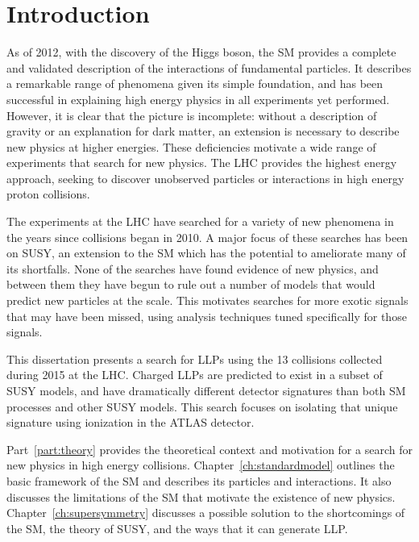 \chapter{Introduction}

\label{ch:introduction}

As of 2012, with the discovery of the Higgs boson, the \ac{SM} provides a complete and validated description of the interactions of fundamental particles.
It describes a remarkable range of phenomena given its simple foundation, and has been successful in explaining high energy physics in all experiments yet performed.
However, it is clear that the picture is incomplete: without a description of gravity or an explanation for dark matter, an extension is necessary to describe new physics at higher energies.
These deficiencies motivate a wide range of experiments that search for new physics.
The \ac{LHC} provides the highest energy approach, seeking to discover unobserved particles or interactions in high energy proton collisions.

The experiments at the \ac{LHC} have searched for a variety of new phenomena in the years since collisions began in 2010.
A major focus of these searches has been on \ac{SUSY}, an extension to the \ac{SM} which has the potential to ameliorate many of its shortfalls.
None of the searches have found evidence of new physics, and between them they have begun to rule out a number of models that would predict new particles at the \TeV scale.
This motivates searches for more exotic signals that may have been missed, using analysis techniques tuned specifically for those signals.

This dissertation presents a search for \acp{LLP} using the 13 \TeV collisions collected during 2015 at the \ac{LHC}.
Charged \acp{LLP} are predicted to exist in a subset of \ac{SUSY} models, and have dramatically different detector signatures than both \ac{SM} processes and other \ac{SUSY} models.
This search focuses on isolating that unique signature using ionization in the ATLAS detector. 

Part~\ref{part:theory} provides the theoretical context and motivation for a search for new physics in high energy collisions.
Chapter~\ref{ch:standardmodel} outlines the basic framework of the \ac{SM} and describes its particles and interactions.
It also discusses the limitations of the \ac{SM} that motivate the existence of new physics.
Chapter~\ref{ch:supersymmetry} discusses a possible solution to the shortcomings of the \ac{SM}, the theory of \acl{SUSY}, and the ways that it can generate \ac{LLP}.

